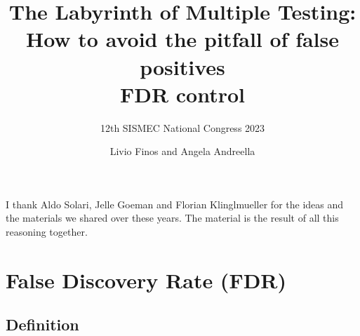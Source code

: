 \documentclass[xcolor={dvipsnames}]{beamer}
\title[]{The Labyrinth of Multiple Testing: How to avoid the pitfall of false positives \\
\vspace*{1cm} \large FDR control}
\subtitle{\vspace*{2cm} \small 12th SISMEC National Congress 2023}
\date{}
\author[\hspace{5cm}]{Livio Finos and Angela Andreella}
\begin{document}
\begin{frame}
  \titlepage
\end{frame}

\begin{frame}
I thank Aldo Solari, Jelle Goeman and Florian Klinglmueller for the ideas and the materials we shared over these years. The material is the result of all this reasoning together.

\end{frame}

\section{False Discovery Rate (FDR)}
\subsection{Definition}
\end{document}

